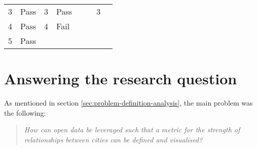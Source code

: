 \begin{table}[h]
\begin{tabular}{llllllll}
3                                                     & Pass                                                  & 3                                                       & Pass                                                  &                                                        &                                                       & 3                                                     &                                                       \\
4                                                     & Pass                                                  & 4                                                       & Fail                                                  &                                                        &                                                       &                                                       &                                                       \\
5                                                     & Pass                                                  &                                                         &                                                       &                                                        &                                                       &                                                       &                                                      
\end{tabular}
\end{table}

\section{Answering the research question}


As mentioned in section \ref{sec:problem-definition-analysis}, the main problem was the following:
\begin{quote} 
\centering 
\textit{How can open data be leveraged such that a metric for the strength of relationships between cities can be defined and visualised?}
\end{quote}


